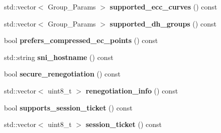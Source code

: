 \begin{DoxyCompactItemize}
\item 
\mbox{\label{class_botan_1_1_t_l_s_1_1_client___hello_a464f495f8c9747218635a318e89237de}} 
std\+::vector$<$ Group\+\_\+\+Params $>$ {\bfseries supported\+\_\+ecc\+\_\+curves} () const
\item 
\mbox{\label{class_botan_1_1_t_l_s_1_1_client___hello_a81985cd99451908b825f6b587ff1b901}} 
std\+::vector$<$ Group\+\_\+\+Params $>$ {\bfseries supported\+\_\+dh\+\_\+groups} () const
\item 
\mbox{\label{class_botan_1_1_t_l_s_1_1_client___hello_ad1ec699557386656cfe817ddf1636788}} 
bool {\bfseries prefers\+\_\+compressed\+\_\+ec\+\_\+points} () const
\item 
\mbox{\label{class_botan_1_1_t_l_s_1_1_client___hello_a0a07c56a2c2f343e0225665da3aebcff}} 
std\+::string {\bfseries sni\+\_\+hostname} () const
\item 
\mbox{\label{class_botan_1_1_t_l_s_1_1_client___hello_af6ffc2bb984d6b56bcb4c45f531b914b}} 
bool {\bfseries secure\+\_\+renegotiation} () const
\item 
\mbox{\label{class_botan_1_1_t_l_s_1_1_client___hello_aa88b190f45d457739457a8ca8b81dfe3}} 
std\+::vector$<$ uint8\+\_\+t $>$ {\bfseries renegotiation\+\_\+info} () const
\item 
\mbox{\label{class_botan_1_1_t_l_s_1_1_client___hello_a2ae1633751181ce99c295ca4535be241}} 
bool {\bfseries supports\+\_\+session\+\_\+ticket} () const
\item 
\mbox{\label{class_botan_1_1_t_l_s_1_1_client___hello_a8730aee26562a456a7f25c2cccfd15c2}} 
std\+::vector$<$ uint8\+\_\+t $>$ {\bfseries session\+\_\+ticket} () const
\item 
\mbox{\label{class_botan_1_1_t_l_s_1_1_client___hello_a4ca07eaae1cd82b6df12460e0b8630f1}} 

\end{DoxyCompactItemize}
